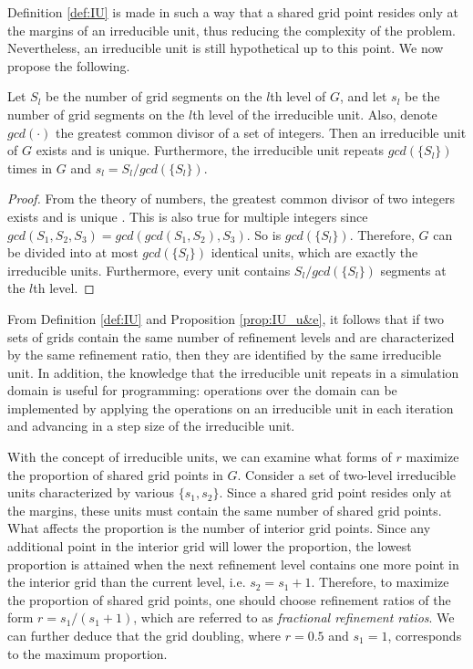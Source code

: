Definition \ref{def:IU} is made in such a way that a shared grid point resides only at the margins of an irreducible unit, thus reducing the complexity of the problem. Nevertheless, an irreducible unit is still hypothetical up to this point. We now propose the following.

\begin{proposition} \label{prop:IU_u&e}
    Let $S_l$ be the number of grid segments on the $l$th level of $G$, and let $s_l$ be the number of grid segments on the $l$th level of the irreducible unit. Also, denote $gcd(\cdot)$ the greatest common divisor of a set of integers. Then an irreducible unit of $G$ exists and is unique. Furthermore, the irreducible unit repeats $gcd(\{S_l\})$ times in $G$ and $s_l = S_l/gcd(\{S_l\})$.
\end{proposition}
\begin{proof}
    From the theory of numbers, the greatest common divisor of two integers exists and is unique \citep{Tattersall2005}. This is also true for multiple integers since $gcd(S_1,S_2,S_3) = gcd(gcd(S_1,S_2),S_3)$. So is $gcd(\{S_l\})$. Therefore, $G$ can be divided into at most $gcd(\{S_l\})$ identical units, which are exactly the irreducible units. Furthermore, every unit contains $S_l/gcd(\{S_l\})$ segments at the $l$th level.
\end{proof}

From Definition \ref{def:IU} and Proposition \ref{prop:IU_u&e}, it follows that if two sets of grids contain the same number of refinement levels and are characterized by the same refinement ratio, then they are identified by the same irreducible unit. In addition, the knowledge that the irreducible unit repeats in a simulation domain is useful for programming: operations over the domain can be implemented by applying the operations on an irreducible unit in each iteration and advancing in a step size of the irreducible unit.

With the concept of irreducible units, we can examine what forms of $r$ maximize the proportion of shared grid points in $G$. Consider a set of two-level irreducible units characterized by various $\{s_1,s_2\}$. Since a shared grid point resides only at the margins, these units must contain the same number of shared grid points. What affects the proportion is the number of interior grid points. Since any additional point in the interior grid will lower the proportion, the lowest proportion is attained when the next refinement level contains one more point in the interior grid than the current level, i.e. $s_2 = s_1 + 1$. Therefore, to maximize the proportion of shared grid points, one should choose refinement ratios of the form $r = s_1 / (s_1 + 1)$, which are referred to as \textit{fractional refinement ratios}. We can further deduce that the grid doubling, where $r=0.5$ and $s_1=1$, corresponds to the maximum proportion.

